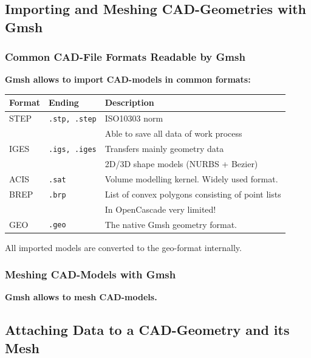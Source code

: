 \subsection{Importing and Meshing CAD-Geometries with Gmsh}

\begin{frame}
  \frametitle{Common CAD-File Formats Readable by Gmsh}
  \textbf{Gmsh allows to import CAD-models in common formats:}
  \begin{center}
    \begin{tabular}{|l|l|l|}
      \hline
      Format & Ending & Description
      \\
      \hline
      \hline
      STEP & \lstinline!.stp, .step! & ISO10303 norm\\
      & & Able to save all data of work process
      \\
      \hline
      IGES & \lstinline!.igs, .iges! & Transfers mainly geometry data\\
      & & 2D/3D shape models (NURBS + Bezier)
      \\
      \hline
      ACIS & \lstinline!.sat! & Volume modelling kernel. Widely used format.
      \\
      \hline
      BREP & \lstinline!.brp! & List of convex polygons consisting of point lists\\
      & & In OpenCascade very limited!
      \\
      \hline
      GEO & \lstinline!.geo! & The native Gmsh geometry format.
      \\
      \hline
    \end{tabular}
  \end{center}
  All imported models are converted to the geo-format internally.
\end{frame}

\begin{frame}
  \frametitle{Meshing CAD-Models with Gmsh}
  \textbf{Gmsh allows to mesh CAD-models.}
\end{frame}

\subsection{Attaching Data to a CAD-Geometry and its Mesh}

